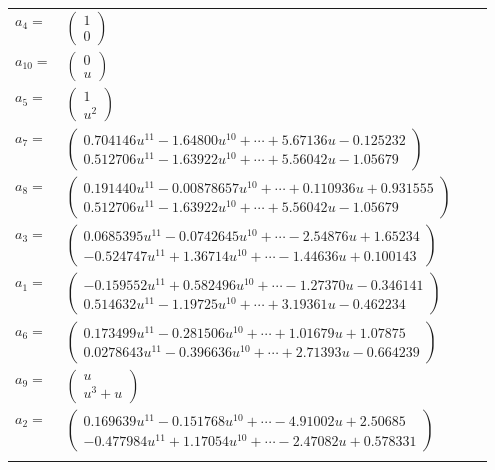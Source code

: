 \documentclass[1p]{elsarticle_modified}
\theoremstyle{definition}
\begin{document}
\begin{tabular}{m{7pt} m{180pt} m{7pt} m{180pt} }
\flushright $a_{4}=$&$\begin{pmatrix}1\\0\end{pmatrix}$ \\
\flushright $a_{10}=$&$\begin{pmatrix}0\\u\end{pmatrix}$ \\
\flushright $a_{5}=$&$\begin{pmatrix}1\\u^2\end{pmatrix}$ \\
\flushright $a_{7}=$&$\begin{pmatrix}0.704146 u^{11}-1.64800 u^{10}+\cdots+5.67136 u-0.125232\\0.512706 u^{11}-1.63922 u^{10}+\cdots+5.56042 u-1.05679\end{pmatrix}$ \\
\flushright $a_{8}=$&$\begin{pmatrix}0.191440 u^{11}-0.00878657 u^{10}+\cdots+0.110936 u+0.931555\\0.512706 u^{11}-1.63922 u^{10}+\cdots+5.56042 u-1.05679\end{pmatrix}$ \\
\flushright $a_{3}=$&$\begin{pmatrix}0.0685395 u^{11}-0.0742645 u^{10}+\cdots-2.54876 u+1.65234\\-0.524747 u^{11}+1.36714 u^{10}+\cdots-1.44636 u+0.100143\end{pmatrix}$ \\
\flushright $a_{1}=$&$\begin{pmatrix}-0.159552 u^{11}+0.582496 u^{10}+\cdots-1.27370 u-0.346141\\0.514632 u^{11}-1.19725 u^{10}+\cdots+3.19361 u-0.462234\end{pmatrix}$ \\
\flushright $a_{6}=$&$\begin{pmatrix}0.173499 u^{11}-0.281506 u^{10}+\cdots+1.01679 u+1.07875\\0.0278643 u^{11}-0.396636 u^{10}+\cdots+2.71393 u-0.664239\end{pmatrix}$ \\
\flushright $a_{9}=$&$\begin{pmatrix}u\\u^3+u\end{pmatrix}$ \\
\flushright $a_{2}=$&$\begin{pmatrix}0.169639 u^{11}-0.151768 u^{10}+\cdots-4.91002 u+2.50685\\-0.477984 u^{11}+1.17054 u^{10}+\cdots-2.47082 u+0.578331\end{pmatrix}$\\&\end{tabular}
\end{document}
